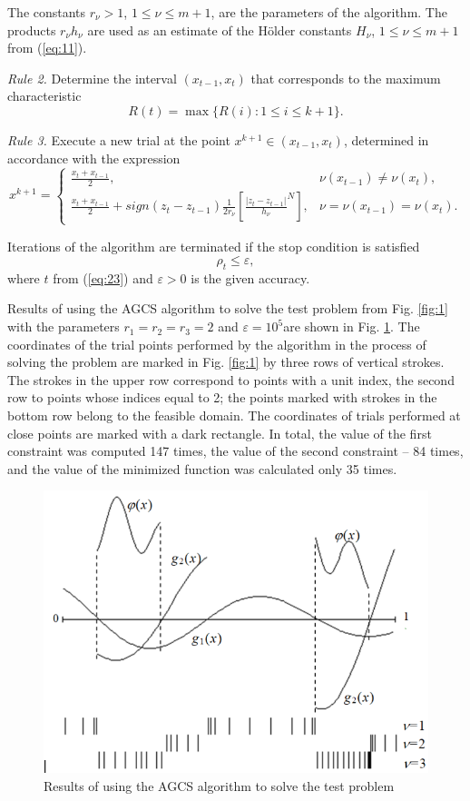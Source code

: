 \documentclass[smallextended]{svjour3}       %
\begin{document}
The constants $r_\nu>1$, $1\leq \nu \leq m+1$, are the parameters of the algorithm. The products $r_\nu h_\nu$ are used as an estimate of the H\"older constants $H_\nu$, $1\leq \nu \leq m+1$ from (\ref{eq:11}).

\textit{Rule 2.} Determine the interval $(x_{t-1},x_t)$ that corresponds to the maximum characteristic
\begin{equation}\label{eq:23}
R(t) = \max{\{R(i):1 \leq i \leq k+1\}}.
\end{equation}

\textit{Rule 3.} Execute a new trial at the point $x^{k+1} \in (x_{t-1},x_t)$, determined in accordance with the expression
\begin{equation}\label{eq:24}
x^{k+1} = 
 \begin{cases}
   \frac{x_t+x_{t-1}}{2}, & \nu(x_{t-1}) \neq \nu(x_t), \\
   \frac{x_t+x_{t-1}}{2} + sign(z_t - z_{t-1}) \frac{1}{2r_\nu}[ \frac{|z_t - z_{t-1}|}{h_\nu}^N ], & \nu = \nu(x_{t-1}) = \nu(x_t).
 \end{cases}
\end{equation}

Iterations of the algorithm are terminated if the stop condition is satisfied
\begin{equation}\label{eq:25}
\rho_t\leq \varepsilon,
\end{equation}
where $t$ from (\ref{eq:23}) and $\varepsilon > 0$ is the given accuracy.

Results of using the AGCS algorithm to solve the test problem from Fig. \ref{fig:1} with the parameters $r_1=r_2=r_3=2$ and $\varepsilon=10^5$are shown in Fig. \ref{fig:2}.  The coordinates of the trial points performed by the algorithm in the process of solving the problem are marked in Fig. \ref{fig:1} by three rows of vertical strokes. The strokes in the upper row correspond to points with a unit index, the second row to points whose indices equal to 2; the points marked with strokes in the bottom row belong to the feasible domain. The coordinates of trials performed at close points are marked with a dark rectangle. In total, the value of the first constraint was computed 147 times, the value of the second constraint -- 84 times, and the value of the minimized function was calculated only 35 times.

\begin{figure}
  \centering
  \includegraphics[width=0.6\linewidth]{fig2}
  \caption{Results of using the AGCS algorithm to solve the test problem}
  \label{fig:2}
\end{figure}
\end{document}
